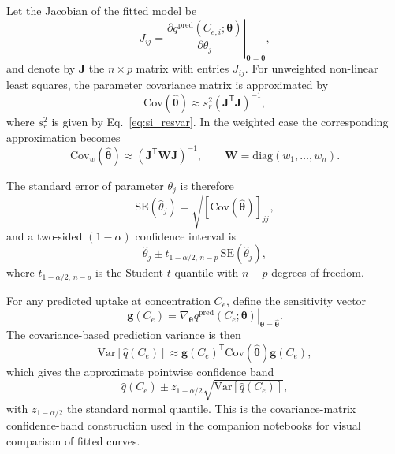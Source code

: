 \documentclass[journal=aamick,manuscript=article]{achemso}
\begin{document}
Let the Jacobian of the fitted model be
\begin{equation}
	J_{ij}
	=
	\left.
	\frac{\partial q^{\mathrm{pred}}(C_{e,i};\boldsymbol{\theta})}
	{\partial \theta_j}
	\right|_{\boldsymbol{\theta}=\hat{\boldsymbol{\theta}}},
	\label{eq:si_Jacobian}
\end{equation}
and denote by $\mathbf{J}$ the $n \times p$ matrix with entries
$J_{ij}$. For unweighted non-linear least squares, the parameter
covariance matrix is approximated by
\begin{equation}
	\mathrm{Cov}(\hat{\boldsymbol{\theta}})
	\approx
	s_r^2 (\mathbf{J}^{\mathsf{T}}\mathbf{J})^{-1},
	\label{eq:si_cov_theta}
\end{equation}
where $s_r^2$ is given by Eq.~\eqref{eq:si_resvar}. In the weighted case
the corresponding approximation becomes
\begin{equation}
	\mathrm{Cov}_w(\hat{\boldsymbol{\theta}})
	\approx
	(\mathbf{J}^{\mathsf{T}}\mathbf{W}\mathbf{J})^{-1},
	\qquad
	\mathbf{W} = \mathrm{diag}(w_1,\dots,w_n).
	\label{eq:si_cov_theta_weighted}
\end{equation}

The standard error of parameter $\theta_j$ is therefore
\begin{equation}
	\mathrm{SE}(\hat{\theta}_j)
	=
	\sqrt{\left[\mathrm{Cov}(\hat{\boldsymbol{\theta}})\right]_{jj}},
	\label{eq:si_SE_theta}
\end{equation}
and a two-sided $(1-\alpha)$ confidence interval is
\begin{equation}
	\hat{\theta}_j
	\pm
	t_{1-\alpha/2,\,n-p}\,
	\mathrm{SE}(\hat{\theta}_j),
	\label{eq:si_CI_theta}
\end{equation}
where $t_{1-\alpha/2,\,n-p}$ is the Student-$t$ quantile with
$n-p$ degrees of freedom.

For any predicted uptake at concentration $C_e$, define the sensitivity
vector
\begin{equation}
	\mathbf{g}(C_e)
	=
	\left.
	\nabla_{\boldsymbol{\theta}}
	q^{\mathrm{pred}}(C_e;\boldsymbol{\theta})
	\right|_{\boldsymbol{\theta}=\hat{\boldsymbol{\theta}}}.
	\label{eq:si_prediction_gradient}
\end{equation}
The covariance-based prediction variance is then
\begin{equation}
	\mathrm{Var}\!\left[\hat{q}(C_e)\right]
	\approx
	\mathbf{g}(C_e)^{\mathsf{T}}
	\mathrm{Cov}(\hat{\boldsymbol{\theta}})
	\mathbf{g}(C_e),
	\label{eq:si_prediction_var}
\end{equation}
which gives the approximate pointwise confidence band
\begin{equation}
	\hat{q}(C_e)
	\pm
	z_{1-\alpha/2}
	\sqrt{\mathrm{Var}\!\left[\hat{q}(C_e)\right]},
	\label{eq:si_confband}
\end{equation}
with $z_{1-\alpha/2}$ the standard normal quantile. This is the
covariance-matrix confidence-band construction used in the companion
notebooks for visual comparison of fitted curves.
\end{document}
